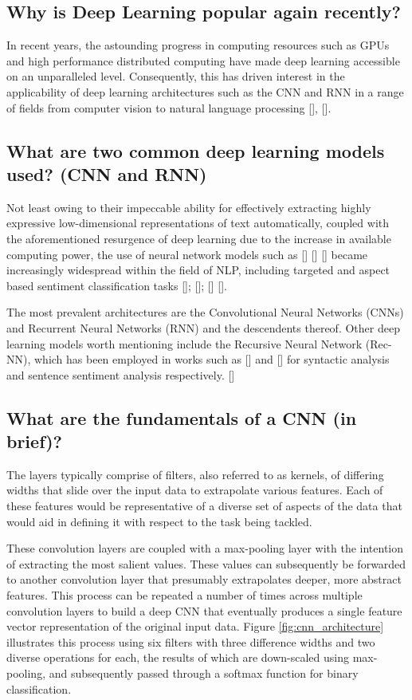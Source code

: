 \documentclass[12pt, a4paper]{report}
\theoremstyle{definition}
\theoremstyle{definition}%
\theoremstyle{definition}%
\theoremstyle{definition}%
\theoremstyle{definition}%
\theoremstyle{definition}%
\renewcommand{\cite}[1]{[\citealp{#1}]}
\begin{document}
\subsection{Why is Deep Learning popular again recently?}
In recent years, the astounding progress in computing resources such as GPUs and high performance distributed computing have made deep learning accessible on an unparalleled level. Consequently, this has driven interest in the applicability of deep learning architectures such as the CNN and RNN in a range of fields from computer vision to natural language processing \cite{goldberg2015}, \cite{collobert2011}.

\subsection{What are two common deep learning models used? (CNN and RNN)}
Not least owing to their impeccable ability for effectively extracting highly expressive low-dimensional representations of text automatically, coupled with the aforementioned resurgence of deep learning due to the increase in available computing power, the use of neural network models such as \cite{lakkaraju2014} \cite{vo2015} \cite{nguyen2015}  became increasingly widespread within the field of NLP, including targeted and aspect based sentiment classification tasks \cite{dong}; \cite{wang}; \cite{tang2016} \cite{tang2016b}.

The most prevalent architectures are the Convolutional Neural Networks (CNNs) and Recurrent Neural Networks (RNN) and the descendents thereof. Other deep learning models worth mentioning include the Recursive Neural Network (Rec-NN), which has been employed in works such as \cite{socher2011} and \cite{socher2013} for syntactic analysis and sentence sentiment analysis respectively. \cite{zhang2018}

\subsection{What are the fundamentals of a CNN (in brief)?}
The layers typically comprise of filters, also referred to as kernels, of differing widths that slide over the input data to extrapolate various features. Each of these features would be representative of a diverse set of aspects of the data that would aid in defining it with respect to the task being tackled.

These convolution layers are coupled with a max-pooling layer with the intention of extracting the most salient values. These values can subsequently be forwarded to another convolution layer that presumably extrapolates deeper, more abstract features. This process can be repeated a number of times across multiple convolution layers to build a deep CNN that eventually produces a single feature vector representation of the original input data. Figure \ref{fig:cnn_architecture} illustrates this process using six filters with three difference widths and two diverse operations for each, the results of which are down-scaled using max-pooling, and subsequently passed through a softmax function for binary classification.
\end{document}
